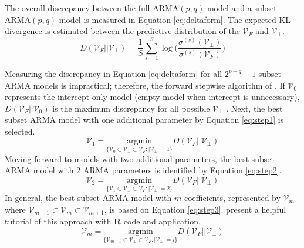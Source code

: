 The overall discrepancy between the full ARMA$(p,q)$ model and a subset ARMA$(p,q)$ model is measured in Equation \ref{eq:deltaform}. The expected KL divergence is estimated between the predictive distribution of the $\mathcal{V}_F$ and $\mathcal{V}_\perp$.
\begin{equation}
\label{eq:deltaform}
	D(\mathcal{V}_F||\mathcal{V}_\perp)=\frac{1}{S}\sum\limits_{s=1}^S \log\bigg(\frac{\sigma^{(s)}(\mathcal{V}_\perp)}{\sigma^{(s)}(\mathcal{V}_F)}\bigg)
\end{equation}

Measuring the discrepancy in Equation \ref{eq:deltaform} for all $2^{p+q}-1$ subset ARMA models is impractical; therefore, the forward stepwise algorithm of \cite{Peltola2014,Piironen2015b}. If $\mathcal{V}_0$ represents the intercept-only model (empty model when intercept is unnecessary), $D(\mathcal{V}_F||\mathcal{V}_0)$ is the maximum discrepancy for all possible $\mathcal{V}_\perp$ \citep{Dupuis2003}. Next, the best subset ARMA model with one additional parameter by Equation \ref{eq:step1} is selected.
\begin{equation}
\label{eq:step1}
\mathcal{V}_1=\underset{\{\mathcal{V}_0\subset\mathcal{V}_\perp\subset \mathcal{V}_F :|\mathcal{V}_\perp|=1\}}{\textrm{argmin}}D(\mathcal{V}_F||\mathcal{V}_\perp)
\end{equation}
Moving forward to models with two additional parameters, the best subset ARMA model with 2 ARMA parameters is identified by Equation \ref{eq:step2}.
\begin{equation}
\label{eq:step2}
\mathcal{V}_2=\underset{\{\mathcal{V}_1\subset\mathcal{V}_\perp\subset \mathcal{V}_F :|\mathcal{V}_\perp|=2\}}{\textrm{argmin}}D(\mathcal{V}_F||\mathcal{V}_\perp)
\end{equation}
In general, the best subset ARMA model with $m$ coefficients, represented by $\mathcal{V}_m$ where $\mathcal{V}_{m-1}\subset\mathcal{V}_m \subset \mathcal{V}_{m+1}$, is based on Equation \ref{eq:step3}. \cite{Piironen2015} present a helpful tutorial of this approach with {\bf R} code and application.
\begin{equation}
\label{eq:step3}
\mathcal{V}_m=\underset{\{\mathcal{V}_{m-1}\subset\mathcal{V}_\perp\subset \mathcal{V}_F :|\mathcal{V}_\perp|=i\}}{\textrm{argmin}}D(\mathcal{V}_F||\mathcal{V}_\perp)
\end{equation}


